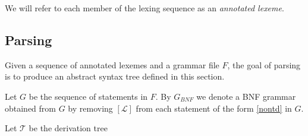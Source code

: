 \documentclass[a4paper,10pt]{article}
\begin{document}
We will refer to each member of the lexing sequence as an \textit{annotated lexeme}.




 




\subsection{Parsing}\label{pars}
Given a sequence of annotated lexemes and a grammar file $F$, the goal of parsing is to produce an abstract syntax tree  defined in this section. 

Let $G$ be the sequence of statements in $F$. By $G_{BNF}$ we denote a BNF grammar obtained from $G$ by removing $[\mathcal{L}]$ from each statement of the form \ref{nontd} in $G$.

Let $\mathcal{T}$ be the derivation tree 



\end{document}
